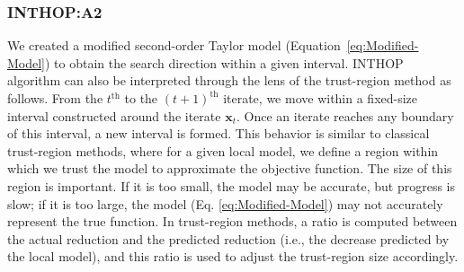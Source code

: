 \documentclass{elsarticle}
\numberwithin{equation}{section}
\begin{document}
\subsubsection{INTHOP:A2}
We created a modified second-order Taylor model (Equation~\ref{eq:Modified-Model}) to obtain the search direction within a given interval. INTHOP algorithm can also be interpreted through the lens of the trust-region method as follows. From the \( t^{\text{th}} \) to the \( (t+1)^{\text{th}} \) iterate, we move within a fixed-size interval constructed around the iterate \( \mathbf{x}_t \). Once an iterate reaches any boundary of this interval, a new interval is formed. This behavior is similar to classical trust-region methods, where for a given local model, we define a region within which we trust the model to approximate the objective function. The size of this region is important. If it is too small, the model may be accurate, but progress is slow; if it is too large, the model (Eq. \ref{eq:Modified-Model}) may not accurately represent the true function. In trust-region methods, a
ratio is computed between the actual reduction and the predicted reduction (i.e., the decrease predicted by the local model), and this ratio is used to adjust the trust-region size accordingly.
\end{document}
